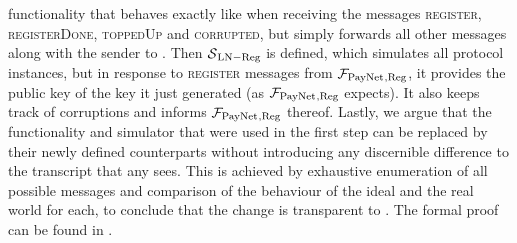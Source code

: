   functionality that behaves exactly like \fpaynet{} when receiving the messages
  \textsc{register}, \textsc{registerDone}, \textsc{toppedUp} and
  \textsc{corrupted}, but simply forwards all other messages along with the
  sender to \simulator. Then $\mathcal{S}{}_{\mathrm{LN - Reg}}$ is defined,
  which simulates all protocol instances, but in response to \textsc{register}
  messages from $\mathcal{F}_{\mathrm{PayNet}}{}_{\mathrm{, Reg}}$, it provides the public key of the
  key it just generated (as $\mathcal{F}_{\mathrm{PayNet}}{}_{\mathrm{, Reg}}$ expects). It also
  keeps track of corruptions and informs $\mathcal{F}_{\mathrm{PayNet}}{}_{\mathrm{, Reg}}$ thereof.
  Lastly, we argue that the functionality and simulator that were used in  the
  first step can be replaced by their newly defined counterparts without
  introducing any discernible difference to the transcript that any
  \environment{} sees. This is achieved by exhaustive enumeration of all
  possible messages and comparison of the behaviour of the ideal and the real
  world for each, to conclude that the change is transparent to \environment.
  The formal proof can be found in .
